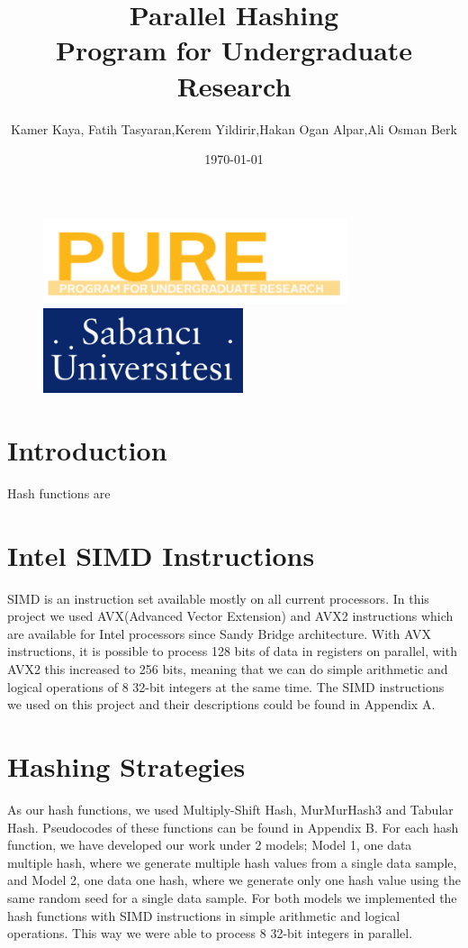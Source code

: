 \documentclass[11pt,oneside,a4paper]{article}
\title{\vspace*{40.0mm}
  \bf\sf Parallel Hashing
         \vspace*{20.0mm} \\
  \vspace*{40.0mm}
  \Large\bf\sf Program for Undergraduate Research \vspace*{20.0mm}}
\author{\sf Kamer Kaya, Fatih Tasyaran,Kerem Yildirir,Hakan Ogan Alpar,Ali Osman Berk}
\date{\sf \today}
\makeatletter
\def\cleardoublepage{\clearpage\if@twoside \ifodd\c@page\else%
\hbox{}%
\thispagestyle{empty}%
\clearpage%
\if@twocolumn\hbox{}\clearpage\fi\fi\fi}
\makeatother
\begin{document}
\begin{figure}
  \parbox[t]{40mm}{
    \begin{flushleft}
      \includegraphics[height=25mm]{pure.png}
    \end{flushleft}}
    \hspace{7cm}
  \parbox[t]{40mm}{
    \begin{flushright}
      \includegraphics[height=25mm]{sabanj.png}
    \end{flushright}}
\end{figure}

\maketitle
\thispagestyle{empty}
\raggedbottom

\cleardoublepage
{}
\setcounter{tocdepth}{2}
\tableofcontents


\section{Introduction}
\par Hash functions are 
\section{Intel SIMD Instructions}
SIMD is an instruction set available mostly on all current processors. In this project we used AVX(Advanced Vector Extension) and AVX2 instructions which are available for Intel processors since Sandy Bridge architecture. With AVX instructions, it is possible to process 128 bits of data in registers on parallel, with AVX2 this increased to 256 bits, meaning that we can do simple arithmetic and logical operations of 8 32-bit integers at the same time. The SIMD instructions we used on this project and their descriptions could be found in Appendix A.
\section{Hashing Strategies}
As our hash functions, we used Multiply-Shift Hash, MurMurHash3  and Tabular Hash. Pseudocodes of these functions can be found in Appendix B. For each hash function, we have developed our work under 2 models; Model 1, one data multiple hash, where we generate multiple hash values from a single data sample, and Model 2, one data one hash, where we generate only one hash value using the same random seed for a single data sample. For both models we implemented the hash functions with SIMD instructions in simple arithmetic and logical operations. This way we were able to process 8 32-bit integers in parallel.
\end{document}
